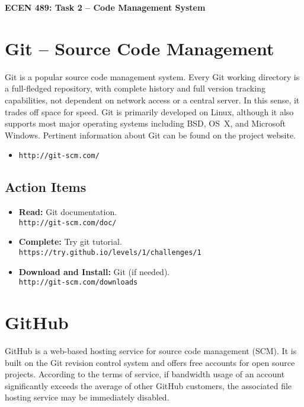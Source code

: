 \documentclass[11pt]{article}
\begin{document}
\begin{center}
{\bfseries \LARGE ECEN 489: Task 2 -- Code Management System\\[8mm]}
\end{center}


\section{Git -- Source Code Management}

Git is a popular source code management system.
Every Git working directory is a full-fledged repository, with complete history and full version tracking capabilities, not dependent on network access or a central server.
In this sense, it trades off space for speed.
Git is primarily developed on Linux, although it also supports most major operating systems including BSD, OS~X, and Microsoft Windows.
Pertinent information about Git can be found on the project website.
\begin{itemize}
\item \texttt{http://git-scm.com/}
\end{itemize}


\subsection*{Action Items}

\begin{itemize}
\item \textbf{Read:} Git documentation. \\
\texttt{http://git-scm.com/doc/}
\item \textbf{Complete:} Try git tutorial. \\
\texttt{https://try.github.io/levels/1/challenges/1}
\item \textbf{Download and Install:} Git (if needed). \\
\texttt{http://git-scm.com/downloads}
\end{itemize}


\section{GitHub}

GitHub is a web-based hosting service for source code management (SCM).
It is built on the Git revision control system and offers free accounts for open source projects.
According to the terms of service, if bandwidth usage of an account significantly exceeds the average of other GitHub customers, the associated file hosting service may be immediately disabled.
\end{document}
